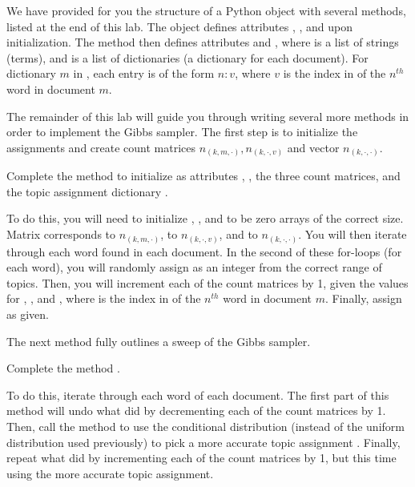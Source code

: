 We have provided for you the structure of a Python object  with several methods, listed at the end of this lab.
The object defines attributes , , and  upon initialization.
The method  then defines attributes  and , where  is a list of strings (terms), and  is a list of dictionaries (a dictionary for each document).
For dictionary $m$ in , each entry is of the form $n : v$, where $v$ is the index in  of the $n^{th}$ word in document $m$.

The remainder of this lab will guide you through writing several more methods in order to implement the Gibbs sampler.
The first step is to initialize the assignments and create count matrices $n_{(k,m,\cdot)}, n_{(k,\cdot,v)}$ and vector $n_{(k,\cdot,\cdot)}$.

\begin{problem}
Complete the method  to initialize as attributes , , the three count matrices, and the topic assignment dictionary .

To do this, you will need to initialize , , and  to be zero arrays of the correct size.
Matrix  corresponds to $n_{(k,m,\cdot)}$,  to $n_{(k,\cdot,v)}$, and  to $n_{(k,\cdot,\cdot)}$.
You will then iterate through each word found in each document.
In the second of these for-loops (for each word), you will randomly assign  as an integer from the correct range of topics.
Then, you will increment each of the count matrices by 1, given the values for , , and , where  is the index in  of the $n^{th}$ word in document $m$.
Finally, assign  as given.
\end{problem}

The next method fully outlines a sweep of the Gibbs sampler.

\begin{problem}
Complete the method .

To do this, iterate through each word of each document.
The first part of this method will undo what  did by decrementing each of the count matrices by 1.
Then, call the method  to use the conditional distribution (instead of the uniform distribution used previously) to pick a more accurate topic assignment .
Finally, repeat what  did by incrementing each of the count matrices by 1, but this time using the more accurate topic assignment.
\end{problem}

